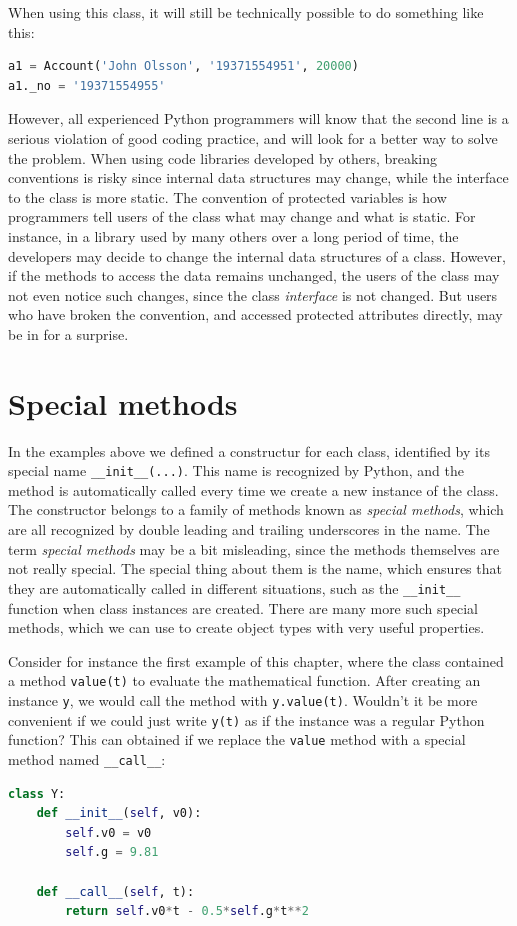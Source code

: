 \documentclass[graybox,envcountchap,sectrefs,final]{svmonodo}
\begin{document}
When using this class, it will still be technically possible to do something like this:
\begin{lstlisting}[language=Python,style=blue1]
a1 = Account('John Olsson', '19371554951', 20000)
a1._no = '19371554955'
\end{lstlisting}
However, all experienced Python programmers will know that the second line is a serious violation of
good coding practice, and will look for a better way to solve the problem. When using code libraries developed by others,
breaking conventions is risky since internal data structures may change, while the interface to the class is more
static. The convention of protected variables is how programmers tell users of the class what may change and
what is static. For instance, in a library used by many others over a long period of time, the developers may decide
to change the internal data structures of a class. However, if the methods to access the data remains unchanged, the users
of the class may not even notice such changes, since the class \emph{interface} is not changed. But users who have broken the
convention, and accessed protected attributes directly, may be in for a surprise.

\section{Special methods}
In the examples above we defined a constructur for each class, identified by its special name \Verb!__init__(...)!. This name
is recognized by Python, and the method is automatically called every time we create a new instance of the class. The
constructor belongs to a family of methods known as \emph{special methods}, which are all recognized by double
leading and trailing underscores in the name. The term \emph{special methods} may be a bit misleading, since the methods themselves
are not really special. The special thing about them is the name, which ensures that they are automatically called in different
situations, such as the \Verb!__init__! function when class instances are created. There are many more such special methods, which
we can use to create object types with very useful properties.

Consider for instance the first example of this chapter, where the class contained a method \texttt{value(t)} to evaluate the
mathematical function. After creating an instance \texttt{y}, we would call the method with \texttt{y.value(t)}. Wouldn't it be
more convenient if we could just write \texttt{y(t)} as if the instance was a regular Python function? This can obtained
if we replace the \texttt{value} method with a special method named \Verb!__call__!:
\begin{lstlisting}[language=Python,style=blue1]
class Y:
    def __init__(self, v0):
        self.v0 = v0
        self.g = 9.81

    def __call__(self, t):
        return self.v0*t - 0.5*self.g*t**2
\end{lstlisting}
\end{document}
